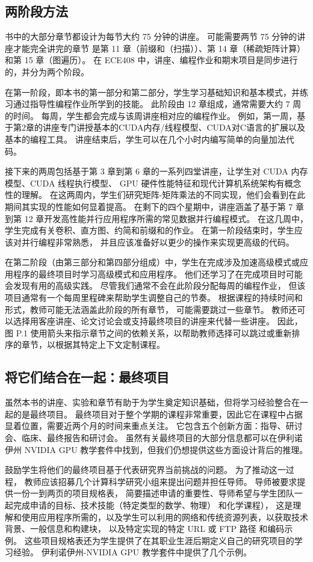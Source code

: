 \subsection{两阶段方法}
书中的大部分章节都设计为每节大约 75 分钟的讲座。 可能需要两节 75 分钟的讲座才能完全讲完的章节
是第 11 章（前缀和（扫描））、第 14 章（稀疏矩阵计算）和第 15 章（图遍历）。 
在 ECE408 中，讲座、编程作业和期末项目是同步进行的，并分为两个阶段。

在第一阶段，即本书的第一部分和第二部分，学生学习基础知识和基本模式，并练习通过指导性编程作业所学到的技能。 
此阶段由 12 章组成，通常需要大约 7 周的时间。 每周，学生都会完成与该周讲座相对应的编程作业。 
例如，第一周，基于第2章的讲座专门讲授基本的CUDA内存/线程模型、CUDA对C语言的扩展以及基本的编程工具。 
讲座结束后，学生可以在几个小时内编写简单的向量加法代码。

接下来的两周包括基于第 3 章到第 6 章的一系列四堂讲座，让学生对 CUDA 内存模型、CUDA 线程执行模型、
GPU 硬件性能特征和现代计算机系统架构有概念性的理解。 
在这两周内，学生们研究矩阵-矩阵乘法的不同实现，他们会看到在此期间其实现的性能如何显着提高。 
在剩下的四个星期中，讲座涵盖了基于第 7 章到第 12 章开发高性能并行应用程序所需的常见数据并行编程模式。
在这几周中，学生完成有关卷积、直方图、约简和前缀和的作业。 在第一阶段结束时，学生应该对并行编程非常熟悉，
并且应该准备好以更少的操作来实现更高级的代码。

在第二阶段（由第三部分和第四部分组成）中，学生在完成涉及加速高级模式或应用程序的最终项目时学习高级模式和应用程序。 
他们还学习了在完成项目时可能会发现有用的高级实践。 尽管我们通常不会在此阶段分配每周的编程作业，
但该项目通常有一个每周里程碑来帮助学生调整自己的节奏。 根据课程的持续时间和形式，教师可能无法涵盖此阶段的所有章节，
可能需要跳过一些章节。 教师还可以选择用客座讲座、论文讨论会或支持最终项目的讲座来代替一些讲座。 
因此，图 P.1 使用箭头来指示章节之间的依赖关系，以帮助教师选择可以跳过或重新排序的章节，以根据其特定上下文定制课程。

\subsection{将它们结合在一起：最终项目}
虽然本书的讲座、实验和章节有助于为学生奠定知识基础，但将学习经验整合在一起的是最终项目。 
最终项目对于整个学期的课程非常重要，因此它在课程中占据显着位置，需要近两个月的时间来重点关注。 
它包含五个创新方面：指导、研讨会、临床、最终报告和研讨会。 
虽然有关最终项目的大部分信息都可以在伊利诺伊州 NVIDIA GPU 教学套件中找到，但我们仍想提供这些方面设计背后的推理。

鼓励学生将他们的最终项目基于代表研究界当前挑战的问题。 为了推动这一过程，
教师应该招募几个计算科学研究小组来提出问题并担任导师。 导师被要求提供一份一到两页的项目规格表，
简要描述申请的重要性、导师希望与学生团队一起完成申请的目标、技术技能（特定类型的数学、物理） 和化学课程），
这是理解和使用应用程序所需的，以及学生可以利用的网络和传统资源列表，以获取技术背景、一般信息和构建块，
以及特定实现的特定 URL 或 FTP 路径 和编码示例。 
这些项目规格表还为学生提供了在其职业生涯后期定义自己的研究项目的学习经验。 
伊利诺伊州-NVIDIA GPU 教学套件中提供了几个示例。

